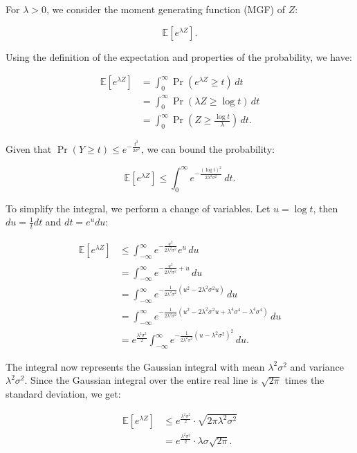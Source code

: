 \documentclass[a4 paper]{article}
\theoremstyle{boldStyle}
\theoremstyle{boldBlueStyle}
\theoremstyle{boldPurpleStyle}
\theoremstyle{boldRedStyle}
\begin{document}
For \(\lambda > 0\), we consider the moment generating function (MGF) of \(Z\):

\[
\mathbb{E}[e^{\lambda Z}].
\]

Using the definition of the expectation and properties of the probability, we have:

\begin{align*}
\mathbb{E}[e^{\lambda Z}] &= \int_0^\infty \Pr(e^{\lambda Z} \geq t) \, dt \\
&= \int_0^\infty \Pr(\lambda Z \geq \log t) \, dt \\
&= \int_0^\infty \Pr\left(Z \geq \frac{\log t}{\lambda}\right) \, dt.
\end{align*}

Given that \(\Pr(Y \geq t) \leq e^{-\frac{t^2}{2\sigma^2}}\), we can bound the probability:

\[
\mathbb{E}[e^{\lambda Z}] \leq \int_0^\infty e^{-\frac{(\log t)^2}{2\lambda^2 \sigma^2}} \, dt.
\]

To simplify the integral, we perform a change of variables. Let \(u = \log t\), then \(du = \frac{1}{t} dt\) and \(dt = e^u du\):

\begin{align*}
\mathbb{E}[e^{\lambda Z}] &\leq \int_{-\infty}^{\infty} e^{-\frac{u^2}{2\lambda^2 \sigma^2}} e^u \, du \\
&= \int_{-\infty}^{\infty} e^{-\frac{u^2}{2\lambda^2 \sigma^2} + u} \, du \\
&= \int_{-\infty}^{\infty} e^{-\frac{1}{2\lambda^2 \sigma^2}(u^2 - 2\lambda^2 \sigma^2 u)} \, du \\
&= \int_{-\infty}^{\infty} e^{-\frac{1}{2\lambda^2 \sigma^2}\left(u^2 - 2\lambda^2 \sigma^2 u + \lambda^4 \sigma^4 - \lambda^4 \sigma^4\right)} \, du \\
&= e^{\frac{\lambda^2 \sigma^2}{2}} \int_{-\infty}^{\infty} e^{-\frac{1}{2\lambda^2 \sigma^2}(u - \lambda^2 \sigma^2)^2} \, du.
\end{align*}

The integral now represents the Gaussian integral with mean \(\lambda^2 \sigma^2\) and variance \(\lambda^2 \sigma^2\). Since the Gaussian integral over the entire real line is \(\sqrt{2\pi}\) times the standard deviation, we get:

\begin{align*}
\mathbb{E}[e^{\lambda Z}] &\leq e^{\frac{\lambda^2 \sigma^2}{2}} \cdot \sqrt{2\pi \lambda^2 \sigma^2} \\
&= e^{\frac{\lambda^2 \sigma^2}{2}} \cdot \lambda \sigma \sqrt{2\pi}.
\end{align*}
\end{document}
